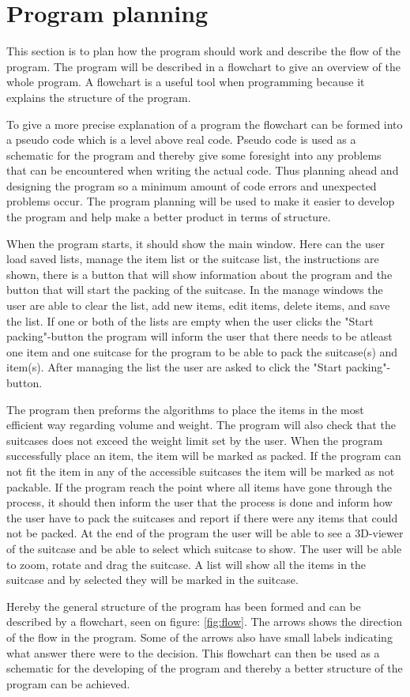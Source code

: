 \section{Program planning}
This section is to plan how the program should work and describe the flow of the program. The program will be described in a flowchart to give an overview of the whole program. A flowchart is a useful tool when programming because it explains the structure of the program.

To give a more precise explanation of a program the flowchart can be formed into a pseudo code which is a level above real code. Pseudo code is used as a schematic for the program and thereby give some foresight into any problems that can be encountered when writing the actual code. Thus planning ahead and designing the program so a minimum amount of code errors and unexpected problems occur.
The program planning will be used to make it easier to develop the program and help make a better product in terms of structure.

When the program starts, it should show the main window. Here can the user load saved lists, manage the item list or the suitcase list, the instructions are shown, there is a button that will show information about the program and the button that will start the packing of the suitcase. In the manage windows the user are able to clear the list, add new items, edit items, delete items, and save the list. If one or both of the lists are empty when the user clicks the "Start packing"-button the program will inform the user that there needs to be atleast one item and one suitcase for the program to be able to pack the suitcase(s) and item(s). After managing the list the user are asked to click the "Start packing"-button.

The program then preforms the algorithms to place the items in the most efficient way regarding volume and weight. The program will also check that the suitcases does not exceed the weight limit set by the user.
When the program successfully place an item, the item will be marked as packed. If the program can not fit the item in any of the accessible suitcases the item will be marked as not packable. If the program reach the point where all items have gone through the process, it should then inform the user that the process is done and inform how the user have to pack the suitcases and report if there were any items that could not be packed.
At the end of the program the user will be able to see a 3D-viewer of the suitcase and be able to select which suitcase to show. The user will be able to zoom, rotate and drag the suitcase. A list will show all the items in the suitcase and by selected they will be marked in the suitcase.


Hereby the general structure of the program has been formed and can be described by a flowchart, seen on figure: \ref{fig:flow}.
The arrows shows the direction of the flow in the program. Some of the arrows also have small labels indicating what answer there were to the decision.
This flowchart can then be used as a schematic for the developing of the program and thereby a better structure of the program can be achieved.